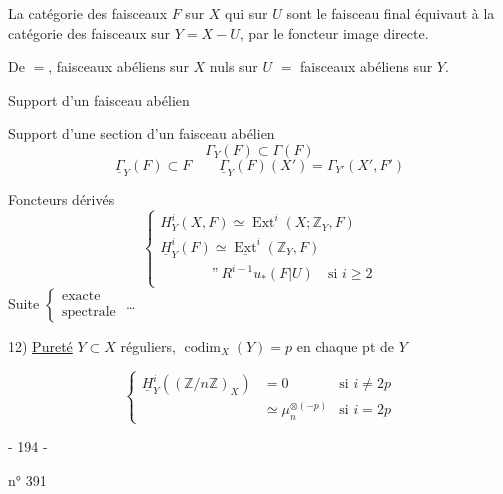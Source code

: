 
La catégorie des faisceaux $F$ sur $X$ qui sur $U$ sont le faisceau final équivaut à la catégorie des faisceaux sur $Y=X-U$, par le foncteur image directe.

De $=$, faisceaux abéliens sur $X$ nuls sur $U$ $=$ faisceaux abéliens sur $Y$.

Support d'un faisceau abélien


Support d'une section d'un faisceau abélien
\[
\Gamma_Y(F)\subset\Gamma(F)
\]
\[
\underline\Gamma_Y(F)\subset F
\qquad
\underline\Gamma_Y(F)(X')=\Gamma_{Y'}(X',F')
\]

Foncteurs dérivés
\[
\left\{\begin{array}{l}
H^i_Y(X,F)\simeq\operatorname{Ext}^i(X;\mathbb Z_Y,F)\\
\underline H^i_Y(F)\simeq\underline{\operatorname{Ext}}^i(\mathbb Z_Y,F)\\
\phantom{\underline H^i_Y(F)}\text{''}\ R^{i-1}u_*(F|U)\quad\text{si }i\geq2
\end{array}\right.
\]
Suite $\left\{\begin{array}{l}\text{exacte}\\\text{spectrale}\end{array}\right.$ \ldots

12) \uline{Pureté}
$Y\subset X$ réguliers, $\operatorname{codim}_X(Y)=p$ en chaque pt de $Y$

\[
\left\{\begin{array}{lll}
\underline H^i_Y((\mathbb Z/n\mathbb Z)_X)&=0&\text{si }i\ne2p\\
&\simeq\mu_n^{\otimes(-p)}&\text{si }i=2p
\end{array}\right.
\]

\begin{center}- 194 -\end{center}
\hfill n° 391

